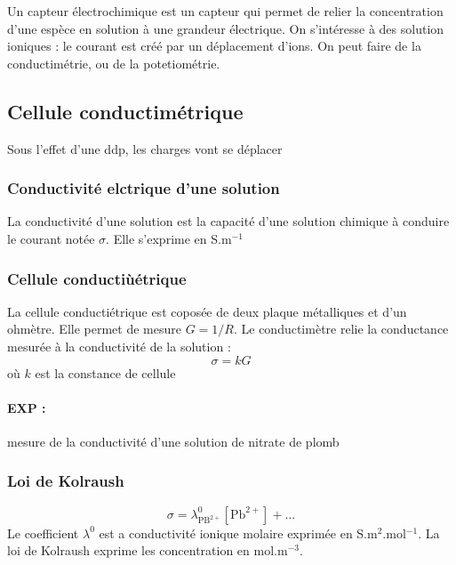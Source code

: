 Un capteur électrochimique est un capteur qui permet de relier la concentration d'une espèce en solution à une grandeur électrique.
On s'intéresse à des solution ioniques : le courant est créé par un déplacement d'ions.
On peut faire de la conductimétrie, ou de la potetiométrie.

\subsection{Cellule conductimétrique}

Sous l'effet d'une ddp, les charges vont se déplacer

\subsubsection{Conductivité elctrique d'une solution}

La conductivité d'une solution est la capacité d'une solution chimique à conduire le courant notée $\sigma$.
Elle s'exprime en S.m$^{-1}$

\subsubsection{Cellule conductiùétrique}

La cellule conductiétrique est coposée de deux plaque métalliques et d'un ohmètre.
Elle permet de mesure $G=1/R$.
Le conductimètre relie la conductance mesurée à la conductivité de la solution :
\begin{equation}
\sigma = kG
\end{equation}
où $k$ est la constance de cellule

\paragraph{EXP :} mesure de la conductivité d'une solution de nitrate de plomb

\subsubsection{Loi de Kolraush}

\begin{equation}
\sigma = \lambda^0_\mathrm{PB^{2+}} [\mathrm{Pb^{2+}}] + ...
\end{equation}
Le coefficient $\lambda^0$ est a conductivité ionique molaire exprimée en S.m$^2$.mol$^{-1}$. La loi de Kolraush exprime les concentration en mol.m$^{-3}$.

